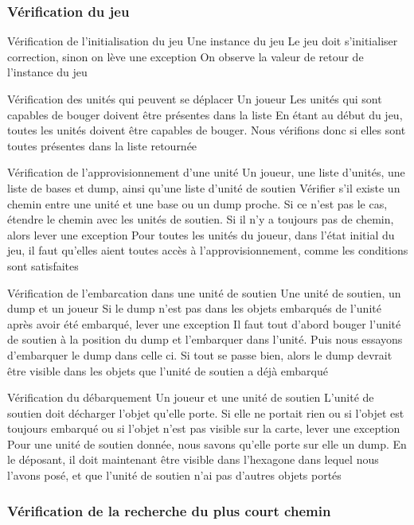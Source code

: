 \subsubsection{Vérification du jeu}

\mytest
{Vérification de l'initialisation du jeu}
{Une instance du jeu}
{Le jeu doit s'initialiser correction, sinon on lève une exception}
{On observe la valeur de retour de l'instance du jeu}

\mytest
{Vérification des unités qui peuvent se déplacer}
{Un joueur}
{Les unités qui sont capables de bouger doivent être présentes dans la liste}
{En étant au début du jeu, toutes les unités doivent être capables de bouger. Nous vérifions donc si elles sont toutes présentes dans la liste retournée}

\mytest
{Vérification de l'approvisionnement d'une unité}
{Un joueur, une liste d'unités, une liste de bases et dump, ainsi qu'une liste d'unité de soutien}
{Vérifier s'il existe un chemin entre une unité et une base ou un dump proche. Si ce n'est pas le cas, étendre le chemin avec les unités de soutien. Si il n'y a toujours pas de
    chemin, alors lever une exception}
{Pour toutes les unités du joueur, dans l'état initial du jeu, il faut qu'elles aient toutes accès à l'approvisionnement, comme les conditions sont satisfaites}

\mytest
{Vérification de l'embarcation dans une unité de soutien}
{Une unité de soutien, un dump et un joueur}
{Si le dump n'est pas dans les objets embarqués de l'unité après avoir été embarqué, lever une exception}
{Il faut tout d'abord bouger l'unité de soutien à la position du dump et l'embarquer dans l'unité. Puis nous essayons d'embarquer le dump dans celle ci. Si tout se
    passe bien, alors le dump devrait être visible dans les objets que l'unité de soutien a déjà embarqué}

\mytest
{Vérification du débarquement}
{Un joueur et une unité de soutien}
{L'unité de soutien doit décharger l'objet qu'elle porte. Si elle ne portait rien ou si l'objet est toujours embarqué ou si l'objet n'est pas visible sur la carte, lever
    une exception}
{Pour une unité de soutien donnée, nous savons qu'elle porte sur elle un dump. En le déposant, il doit maintenant être visible dans l'hexagone dans lequel nous l'avons
    posé, et que l'unité de soutien n'ai pas d'autres objets portés}

\subsubsection{Vérification de la recherche du plus court chemin}

